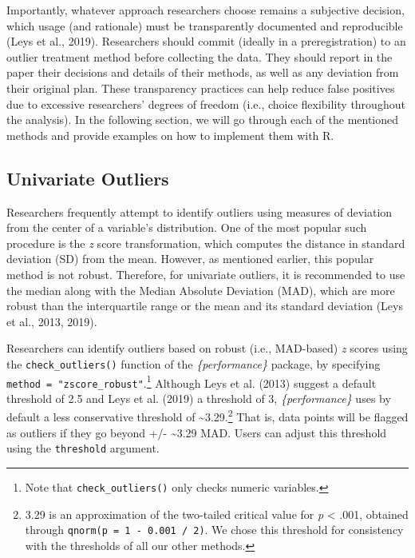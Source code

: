 \documentclass{article}
\begin{document}
Importantly, whatever approach researchers choose remains a subjective
decision, which usage (and rationale) must be transparently documented
and reproducible (Leys et al., 2019). Researchers should commit (ideally
in a preregistration) to an outlier treatment method before collecting
the data. They should report in the paper their decisions and details of
their methods, as well as any deviation from their original plan. These
transparency practices can help reduce false positives due to excessive
researchers' degrees of freedom (i.e., choice flexibility throughout the
analysis). In the following section, we will go through each of the
mentioned methods and provide examples on how to implement them with R.

\hypertarget{univariate-outliers}{%
\subsection{Univariate Outliers}\label{univariate-outliers}}

Researchers frequently attempt to identify outliers using measures of
deviation from the center of a variable's distribution. One of the most
popular such procedure is the \emph{z} score transformation, which
computes the distance in standard deviation (SD) from the mean. However,
as mentioned earlier, this popular method is not robust. Therefore, for
univariate outliers, it is recommended to use the median along with the
Median Absolute Deviation (MAD), which are more robust than the
interquartile range or the mean and its standard deviation (Leys et al.,
2013, 2019).

Researchers can identify outliers based on robust (i.e., MAD-based)
\emph{z} scores using the \texttt{check\_outliers()} function of the
\emph{\{performance\}} package, by specifying
\texttt{method\ =\ "zscore\_robust"}.\footnote{Note that
  \texttt{check\_outliers()} only checks numeric variables.} Although
Leys et al. (2013) suggest a default threshold of 2.5 and Leys et al.
(2019) a threshold of 3, \emph{\{performance\}} uses by default a less
conservative threshold of \textasciitilde3.29.\footnote{3.29 is an
  approximation of the two-tailed critical value for \emph{p}
  \textless{} .001, obtained through
  \texttt{qnorm(p\ =\ 1\ -\ 0.001\ /\ 2)}. We chose this threshold for
  consistency with the thresholds of all our other methods.} That is,
data points will be flagged as outliers if they go beyond +/-
\textasciitilde3.29 MAD. Users can adjust this threshold using the
\texttt{threshold} argument.
\end{document}
